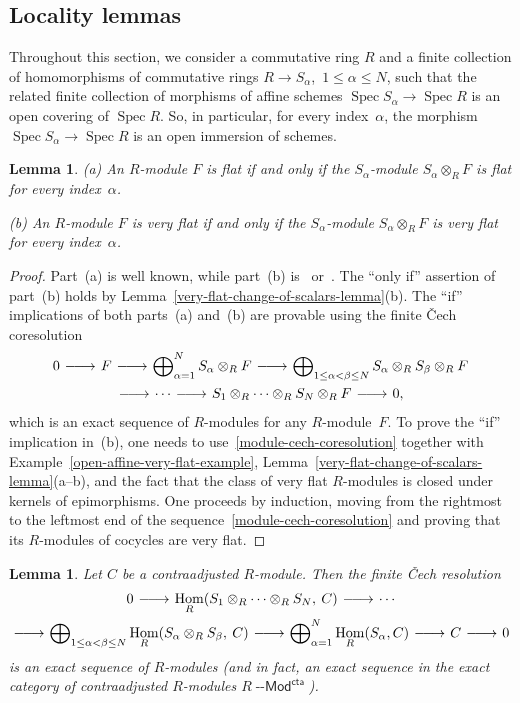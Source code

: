 \documentclass[12pt,a4paper]{amsart}
\newcommand{\+}{\nobreakdash-}
\renewcommand{\:}{\colon}
\newcommand{\rarrow}{\longrightarrow}
\newcommand{\ot}{\otimes}
\newcommand{\lrarrow}{\mskip.5\thinmuskip\relbar\joinrel\relbar
   \joinrel\rightarrow\mskip.5\thinmuskip\relax}
\DeclareMathOperator{\Hom}{Hom}
\DeclareMathOperator{\Spec}{Spec}
\newcommand{\Modl}{{\operatorname{\mathsf{--Mod}}}}
\newcommand{\cta}{\mathsf{cta}}
\theoremstyle{plain}
\newtheorem{lem}[thm]{Lemma}
\theoremstyle{definition}
\begin{document}
\subsection{Locality lemmas}
 Throughout this section, we consider a commutative ring $R$ and
a finite collection of homomorphisms of commutative rings
$R\rarrow S_\alpha$, \,$1\le\alpha\le N$, such that the related
finite collection of morphisms of affine schemes $\Spec S_\alpha
\rarrow\Spec R$ is an open covering of $\Spec R$.
 So, in particular, for every index~$\alpha$, the morphism
$\Spec S_\alpha\rarrow\Spec R$ is an open immersion of schemes.

\begin{lem} \label{very-flatness-local}
\textup{(a)} An $R$\+module $F$ is flat if and only if
the $S_\alpha$\+module $S_\alpha\ot_RF$ is flat for every
index\/~$\alpha$. \par
\textup{(b)} An $R$\+module $F$ is very flat if and only if
the $S_\alpha$\+module $S_\alpha\ot_RF$ is very flat for every
index\/~$\alpha$.
\end{lem}

\begin{proof}
 Part~(a) is well known, while part~(b) is~\cite[Lemma~1.2.6(a)]{Pcosh}
or~\cite[Example~2.5]{Pal}.
 The ``only if'' assertion of part~(b) holds by
Lemma~\ref{very-flat-change-of-scalars-lemma}(b).
 The ``if'' implications of both parts~(a) and~(b) are provable using
the finite \v Cech coresolution
\begin{multline} \label{module-cech-coresolution}
 0\lrarrow F\lrarrow\bigoplus\nolimits_{\alpha=1}^N
 S_\alpha\ot_RF\lrarrow\bigoplus\nolimits_{1\le\alpha<\beta\le N}
 S_\alpha\ot_RS_\beta\ot_RF \\
 \lrarrow\dotsb\lrarrow S_1\ot_R\dotsb\ot_RS_N\ot_RF\lrarrow0,
\end{multline}
which is an exact sequence of $R$\+modules for any $R$\+module~$F$.
 To prove the ``if'' implication in~(b), one needs to
use~\eqref{module-cech-coresolution} together with
Example~\ref{open-affine-very-flat-example},
Lemma~\ref{very-flat-change-of-scalars-lemma}(a\+-b), and
the fact that the class of very flat $R$\+modules is closed
under kernels of epimorphisms.
 One proceeds by induction, moving from the rightmost to
the leftmost end of the sequence~\eqref{module-cech-coresolution}
and proving that its $R$\+modules of cocycles are very flat.
\end{proof}

\begin{lem} \label{contraadjusted-cech-resolution}
 Let $C$ be a contraadjusted $R$\+module.
 Then the finite \v Cech resolution
\begin{multline} \label{cta-module-cech-resolution}
 0\lrarrow\Hom_R(S_1\ot_R\dotsb\ot_R S_N,\>C)\lrarrow\dotsb \\
 \lrarrow\bigoplus\nolimits_{1\le\alpha<\beta\le N}
 \Hom_R(S_\alpha\ot_RS_\beta,\>C)\lrarrow
 \bigoplus\nolimits_{\alpha=1}^N\Hom_R(S_\alpha,C)
 \lrarrow C\lrarrow 0
\end{multline}
is an exact sequence of $R$\+modules (and in fact, an exact
sequence in the exact category of contraadjusted $R$\+modules
$R\Modl^\cta$).
\end{lem}
\end{document}
